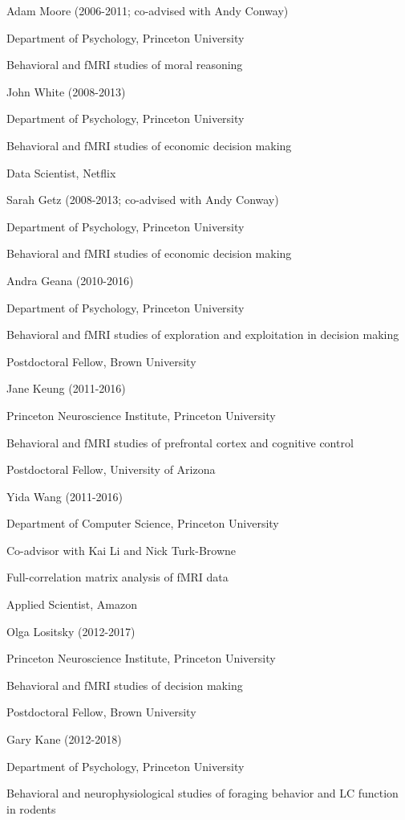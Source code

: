 \documentclass[10 pt]{article}
\begin{document}
Adam Moore (2006-2011; co-advised with Andy Conway)

Department of Psychology, Princeton University

Behavioral and fMRI studies of moral reasoning
    \medskip

John White (2008-2013)

Department of Psychology, Princeton University

Behavioral and fMRI studies of economic decision making

Data Scientist, Netflix
    \medskip

Sarah Getz (2008-2013; co-advised with Andy Conway)

Department of Psychology, Princeton University

Behavioral and fMRI studies of economic decision making
    \medskip

Andra Geana (2010-2016)

Department of Psychology, Princeton University

Behavioral and fMRI studies of exploration and exploitation in decision making

Postdoctoral Fellow, Brown University
    \medskip

Jane Keung (2011-2016)

Princeton Neuroscience Institute, Princeton University

Behavioral and fMRI studies of prefrontal cortex and cognitive control

Postdoctoral Fellow, University of Arizona
    \medskip

Yida Wang (2011-2016)

Department of Computer Science, Princeton University

Co-advisor with Kai Li and Nick Turk-Browne

Full-correlation matrix analysis of fMRI data

Applied Scientist, Amazon
    \medskip

Olga Lositsky (2012-2017)

Princeton Neuroscience Institute, Princeton University

Behavioral and fMRI studies of decision making

Postdoctoral Fellow, Brown University
    \medskip

Gary Kane (2012-2018)

Department of Psychology, Princeton University

Behavioral and neurophysiological studies of foraging behavior and LC function in rodents
\end{document}

